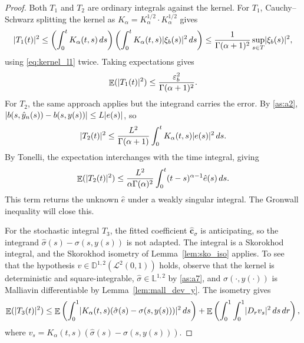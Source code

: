 \documentclass[11pt, a4paper]{article}
\theoremstyle{theoremstyle}
\theoremstyle{definitionstyle}
\newcommand{\dd}{\mathop{}\!d}
\DeclareMathOperator{\EE}{\mathbb E}
\DeclarePairedDelimiter{\abs}{\lvert}{\rvert}
\begin{document}
\begin{proof}
    Both $T_1$ and $T_2$ are ordinary integrals against the kernel. For $T_1$, Cauchy--Schwarz splitting the kernel as $K_\alpha = K_\alpha^{1/2}\cdot K_\alpha^{1/2}$ gives
    \begin{equation}
        \abs{T_1(t)}^2 \leq \left ( \int_0^t K_\alpha(t, s)\dd{s} \right ) \left ( \int_0^t K_\alpha(t, s)\abs{\xi_b(s)}^2\dd{s} \right ) \leq \frac 1{\Gamma(\alpha+1)^2}\sup_{s \in T}\abs{\xi_b(s)}^2,
    \end{equation}
    using \eqref{eq:kernel_l1} twice. Taking expectations gives
    \begin{equation}\label{eq:T1_bound}
        \EE (\abs{T_1(t)}^2) \leq \frac{\varepsilon_b^2}{\Gamma(\alpha+1)^2}.
    \end{equation}
    For $T_2$, the same approach applies but the integrand carries the error. By \ref{as:a2}, $\abs{b(s, \hat y_n(s)) - b(s, y(s))} \leq L\abs{e(s)}$, so
    \begin{equation}
        \abs{T_2(t)}^2 \leq \frac{L^2}{\Gamma(\alpha+1)}\int_0^t K_\alpha(t, s)\abs{e(s)}^2\dd{s}.
    \end{equation}
    By Tonelli, the expectation interchanges with the time integral, giving
    \begin{equation}\label{eq:T2_bound}
        \EE (\abs{T_2(t)}^2) \leq \frac{L^2}{\alpha\Gamma(\alpha)^2}\int_0^t(t - s)^{\alpha - 1}\hat e(s)\dd{s}.
    \end{equation}
    This term returns the unknown $\hat e$ under a weakly singular integral. The Gronwall inequality will close this.

    For the stochastic integral $T_3$, the fitted coefficient $\hat{\mathbf c}_\sigma$ is anticipating, so the integrand $\hat\sigma(s) - \sigma(s,y(s))$ is not adapted. The integral is a Skorokhod integral, and the Skorokhod isometry of Lemma~\ref{lem:sko_iso} applies. To see that the hypothesis $v \in \mathbb D^{1,2}(\mathcal L^2(0,1))$ holds, observe that the kernel is deterministic and square-integrable, $\hat \sigma \in \mathbb L^{1,2}$ by \ref{as:a7}, and $\sigma(\cdot, y(\cdot))$ is Malliavin differentiable by Lemma~\ref{lem:mall_dev_y}. The isometry gives
    \begin{equation}
        \EE (\abs{T_3(t)}^2) \leq \EE \left ( \int_0^1 \abs{K_\alpha(t,s)(\hat\sigma(s)-\sigma(s,y(s)))}^2\dd{s} \right ) + \EE \left ( \int_0^1\int_0^1 \abs{D_r v_s}^2\dd{s}\dd{r} \right ),
    \end{equation}
    where $v_s = K_\alpha(t,s)(\hat\sigma(s)-\sigma(s,y(s)))$. 


\end{proof}
\end{document}

